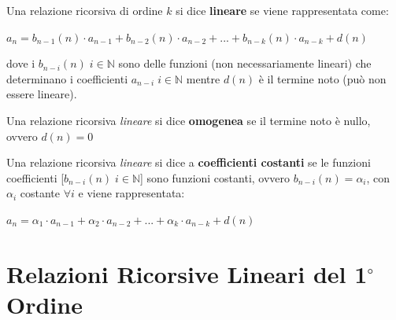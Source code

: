 \begin{flushleft}
    Una relazione ricorsiva di ordine $k$ si dice \textbf{lineare} se viene rappresentata come:

    {\centering
        $a_n = b_{n - 1}(n) \cdot a_{n - 1} + b_{n - 2}(n) \cdot a_{n - 2} + ... + b_{n - k}(n) \cdot a_{n - k} + d(n)$
    \par}
    dove i $b_{n - i}(n) \; i \in \mathbb{N}$ sono delle funzioni (non necessariamente lineari) che determinano i coefficienti $a_{n - i} \; i \in \mathbb{N}$ mentre $d(n)$ è il termine noto (può non essere lineare).

    Una relazione ricorsiva \textit{lineare} si dice \textbf{omogenea} se il termine noto è nullo, ovvero $d(n) = 0$

    Una relazione ricorsiva \textit{lineare} si dice a \textbf{coefficienti costanti} se le funzioni coefficienti [$b_{n - i}(n) \; i \in \mathbb{N}$] sono funzioni costanti, ovvero $b_{n - i}(n) = \alpha_i$, con $\alpha_i$ costante $\forall i$ e viene rappresentata:

    {\centering
        $a_n = \alpha_1 \cdot a_{n - 1} + \alpha_2 \cdot a_{n - 2} + ... + \alpha_k \cdot a_{n - k} + d(n)$
    \par}
\end{flushleft}

\section{Relazioni Ricorsive Lineari del 1$^\circ$ Ordine}

